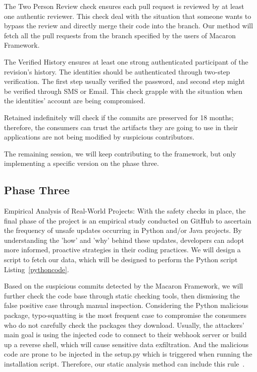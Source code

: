 The Two Person Review check ensures each pull request is reviewed by at least one authentic reviewer.
This check deal with the situation that someone wants to bypass the review and directly merge 
their code into the branch. Our method will fetch all the pull requests from the branch 
specified by the users of Macaron Framework.

The Verified History ensures at least one strong authenticated participant of the revision's history.
The identities should be authenticated through two-step verification. The first step usually 
verified the password, and second step might be verified through SMS or Email. This check grapple
with the situation when the identities' account are being compromised.

Retained indefinitely will check if the commits are preserved for 18 months; therefore, the
consumers can trust the artifacts they are going to use in their applications are not being 
modified by suspicious contributors.

The remaining session, we will keep contributing to the framework, but only implementing a
specific version on the phase three.
\subsection{Phase Three}
Empirical Analysis of Real-World Projects: With the safety checks in place, 
the final phase of the project is an empirical study conducted on GitHub to ascertain
the frequency of unsafe updates occurring in Python and/or Java projects.
By understanding the 'how' and 'why' behind these updates, developers can adopt more 
informed, proactive strategies in their coding practices. We will design a script to fetch
our data, which will be designed to perform the Python script Listing~\ref{pythoncode}.

Based on the suspicious commits detected by the Macaron Framework, we will further check the 
code base through static checking tools, then dismissing the false positive case through manual inspection.
Considering the Python malicious package, typo-squatting is the most frequent case to compromise 
the consumers who do not carefully check the packages they download. Usually, the attackers' main
goal is using the injected code to connect to their webhook server or build up a reverse shell, which 
will cause sensitive data exfiltration. And the malicious code are prone to be injected in the 
setup.py which is triggered when running the installation script. Therefore, our static analysis 
method can include this rule~\cite{bertus2018detecting}.

